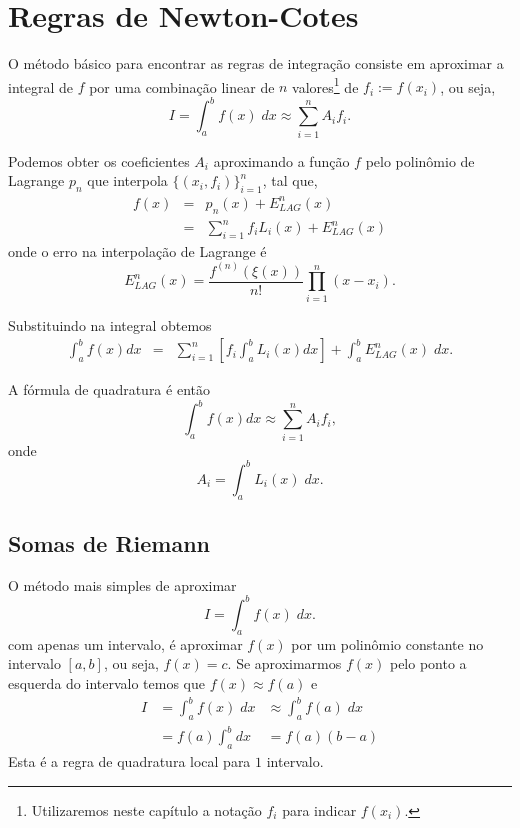 \section{Regras de Newton-Cotes}

O método básico para encontrar as regras de integração consiste em aproximar a integral de $f$ por uma combinação linear de $n$ valores\footnote{Utilizaremos neste capítulo a notação $f_i$ para indicar $f(x_i)$.} de $f_i := f(x_i)$, ou seja,
$$
 I = \int_a^b f(x) \;dx \approx \sum_{i=1}^nA_if_i.
$$


Podemos obter os coeficientes $A_i$ aproximando a função $f$ pelo polinômio de Lagrange $p_n$ que interpola $\{(x_i,f_i)\}_{i=1}^n$, tal que, 
\begin{eqnarray}
  f(x) &=& p_n(x)+E^n_{LAG}(x) \\
       &=& \sum_{i=1}^n f_iL_i(x)+E^n_{LAG}(x) 
\end{eqnarray}
onde o erro na interpolação de Lagrange é
\begin{equation}
   E^n_{LAG}(x)=\frac{f^{(n)}(\xi(x))}{n!}\prod_{i=1}^n(x-x_i).
\end{equation}

Substituindo na integral obtemos
\begin{eqnarray}
  \int_a^bf(x)dx &=& \sum_{i=1}^n\left[f_i\int_a^bL_i(x)dx\right] +  \int_a^b E^n_{LAG}(x) \;dx.
\end{eqnarray}


A fórmula de quadratura é então 
\begin{equation}
\int_a^bf(x)dx\approx\sum_{i=1}^nA_if_i,
\end{equation}
onde
\begin{equation}
A_i=\int_a^b L_i(x)\;dx.
\end{equation}


\subsection{Somas de Riemann}
O método mais simples de aproximar 
$$
 I = \int_a^b f(x) \;dx.
$$
com apenas um intervalo, é aproximar $f(x)$ por um polinômio constante no intervalo $[a,b]$, ou seja, $f(x)=c$. Se aproximarmos $f(x)$ pelo ponto a esquerda do intervalo temos que $f(x)\approx f(a)$ e
\begin{eqnarray}
 I &= \int_a^b f(x) \;dx 
   &\approx \int_a^b f(a) \;dx \\
   &= f(a) \int_a^b dx 
   &= f(a) (b-a)
\end{eqnarray}
Esta é a regra de quadratura local para $1$ intervalo.

